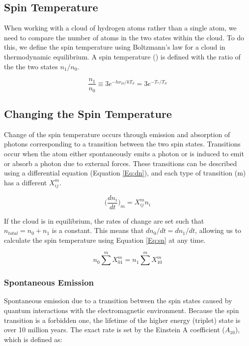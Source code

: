 \subsection{Spin Temperature}
When working with a cloud of hydrogen atoms rather than a single atom, we need to compare the number of atoms in the two states within the cloud. To do this, we define the spin temperature using Boltzmann's law for a cloud in thermodynamic equilibrium. A spin temperature (\ts) is defined with the ratio of the the two states $n_1/n_0$. 

\begin{equation}\label{Eq:T_s}
\frac{n_1}{n_0} \equiv 3 e^{- h \nu_{10} / kT_S} = 3 e^{-T_*/T_S}
\end{equation} 

\subsection{Changing the Spin Temperature} \label{Sec:dT_S}
Change of the spin temperature occurs through emission and absorption of \cm photons corresponding to a transition between the two spin states. Transitions occur when the atom either spontaneously emits a photon or is induced to emit or absorb a photon due to external forces. These transitions can be described using a differential equation (Equation \ref{Eq:dn}), and each type of transition (m) has a different $X^m_{ij}$. 

\begin{equation} \label{Eq:dn}
\Big( \frac{d n_i}{dt} \Big)_m = X^m_{ij} n_i
\end{equation}

If the cloud is in equilibrium, the rates of change are set such that $n_{total} = n_0 + n_1$ is a constant. This means that $d n_0/dt = d n_1 /dt$, allowing us to calculate the spin temperature using Equation \ref{Eq:sn} at any time.

\begin{equation} \label{Eq:sn}
n_0 \sum^m X^m_{01} = n_1 \sum^m X^m_{10}
\end{equation}

\subsubsection{Spontaneous Emission}
Spontaneous emission due to a transition between the spin states caused by quantum interactions with the electromagnetic environment. Because the spin transition is a forbidden one, the lifetime of the higher energy (triplet) state is over 10 million years. The exact rate is set by the Einstein A coefficient ($A_{10}$), which is defined as: 

